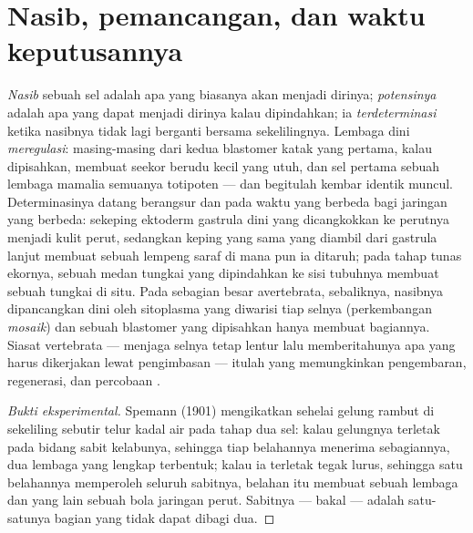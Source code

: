 \section{Nasib, pemancangan, dan waktu keputusannya}

\begin{proposition}\label{prop:b2:vertebrate-development:commitment}
\emph{Nasib} sebuah sel adalah apa yang biasanya akan menjadi dirinya;
\emph{potensinya} adalah apa yang dapat menjadi dirinya kalau
dipindahkan; ia \emph{terdeterminasi} ketika nasibnya tidak lagi
berganti bersama sekelilingnya. Lembaga dini \emph{meregulasi}:
masing-masing dari kedua blastomer katak yang pertama, kalau
dipisahkan, membuat seekor berudu kecil yang utuh, dan sel pertama
sebuah lembaga mamalia semuanya totipoten --- dan begitulah kembar
identik muncul. Determinasinya datang berangsur dan pada waktu yang
berbeda bagi jaringan yang berbeda: sekeping ektoderm gastrula dini
yang dicangkokkan ke perutnya menjadi kulit perut, sedangkan keping
yang sama yang diambil dari gastrula lanjut membuat sebuah lempeng
saraf di mana pun ia ditaruh; pada tahap tunas ekornya, sebuah medan
tungkai yang dipindahkan ke sisi tubuhnya membuat sebuah tungkai di
situ. Pada sebagian besar avertebrata, sebaliknya, nasibnya dipancangkan
dini oleh sitoplasma yang diwarisi tiap selnya (perkembangan
\emph{mosaik}) dan sebuah blastomer yang dipisahkan hanya membuat
bagiannya. Siasat vertebrata --- menjaga selnya tetap lentur lalu
memberitahunya apa yang harus dikerjakan lewat pengimbasan --- itulah
yang memungkinkan pengembaran, regenerasi, dan percobaan .
\end{proposition}
\begin{proof}[Bukti eksperimental]
Spemann (1901) mengikatkan sehelai gelung rambut di sekeliling sebutir
telur kadal air pada tahap dua sel: kalau gelungnya terletak pada
bidang sabit kelabunya, sehingga tiap belahannya menerima sebagiannya,
dua lembaga yang lengkap terbentuk; kalau ia terletak tegak lurus,
sehingga satu belahannya memperoleh seluruh sabitnya, belahan itu
membuat sebuah lembaga dan yang lain sebuah bola jaringan perut.
Sabitnya --- bakal  --- adalah satu-satunya bagian yang
tidak dapat dibagi dua.
\end{proof}

